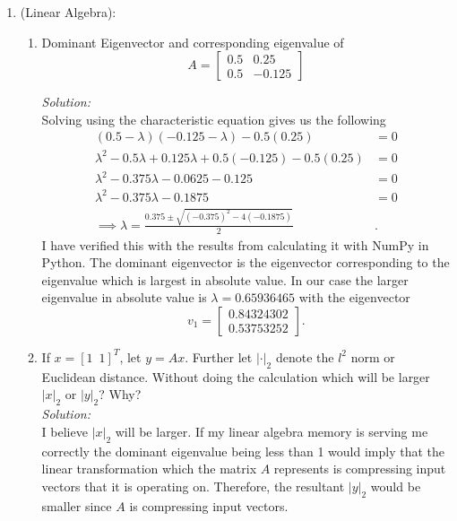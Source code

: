\documentclass[10pt]{amsart}
\theoremstyle{nonumberplain}
\begin{document}
\begin{enumerate}[label={\bf {Question \arabic*}}]
\item (Linear Algebra): \\
\begin{enumerate}

\item Dominant Eigenvector and corresponding eigenvalue of
$$A =
\begin{bmatrix}
0.5 & 0.25 \\
0.5 & -0.125
\end{bmatrix}
$$

\textit{Solution:} \\
Solving using the characteristic equation gives us the following
\begin{align*}
(0.5 - \lambda)(-0.125-\lambda) - 0.5(0.25) &= 0 \\
\lambda^2 -0.5\lambda + 0.125\lambda + 0.5(-0.125) - 0.5(0.25) &= 0 \\
\lambda^2 -0.375\lambda -0.0625 - 0.125 &= 0 \\
\lambda^2 -0.375\lambda -0.1875 &= 0 \\
\implies \lambda = \frac{0.375 \pm \sqrt{(-0.375)^2 - 4(-0.1875)}}{2} &.
\end{align*}
I have verified this with the results from calculating it with NumPy in Python.
The dominant eigenvector is the eigenvector corresponding to the eigenvalue which is largest in absolute value.
In our case the larger eigenvalue in absolute value is 
$\lambda = 0.65936465$ with the eigenvector
$$
v_1 = \begin{bmatrix}
0.84324302 \\
0.53753252
\end{bmatrix}.
$$

\item If $x = [1 \;\: 1]^T$, let $y = Ax$. Further let $|\cdot|_2$ denote the $l^2$ norm or Euclidean distance. Without doing the calculation which will be larger $|x|_2$ or $|y|_2$? Why? \\

\textit{Solution:} \\
I believe $|x|_2$ will be larger.
If my linear algebra memory is serving me correctly the dominant eigenvalue being less than 1 would imply that the linear transformation which the matrix $A$ represents is compressing input vectors that it is operating on.
Therefore, the resultant $|y|_2$ would be smaller since $A$ is compressing input vectors. \\


\end{enumerate}
\end{enumerate}
\end{document}
